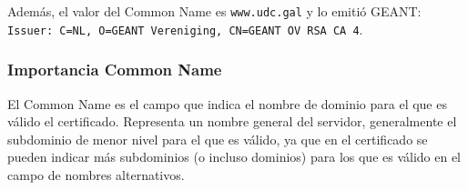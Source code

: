Además, el valor del Common Name es \texttt{www.udc.gal} y lo emitió GEANT: \texttt{Issuer: C=NL, O=GEANT Vereniging, CN=GEANT OV RSA CA 4}.

\subsubsection{Importancia Common Name}

El Common Name es el campo que indica el nombre de dominio para el que es válido el certificado. Representa un nombre general del servidor, generalmente el subdominio de menor nivel para el que es válido, ya que en el certificado se pueden indicar más subdominios (o incluso dominios) para los que es válido en el campo de nombres alternativos.
